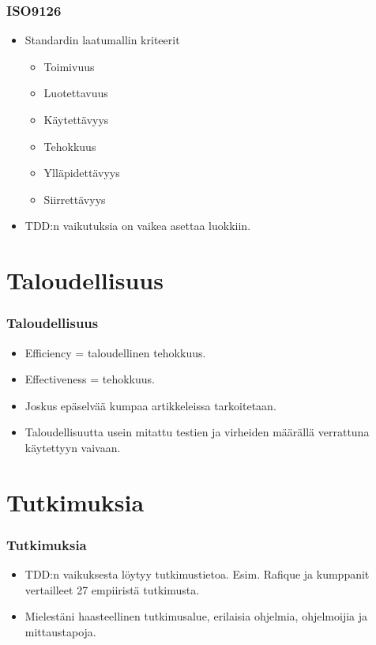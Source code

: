 \documentclass{beamer}
\begin{document}
\begin{frame}
    	\frametitle{ISO9126}
	\begin{itemize}
	\item Standardin laatumallin kriteerit
		\begin{itemize}
		\item Toimivuus
		\item Luotettavuus
		\item Käytettävyys
		\item Tehokkuus
		\item Ylläpidettävyys
		\item Siirrettävyys
		\end{itemize}
	\item TDD:n vaikutuksia on vaikea asettaa luokkiin.
	\end{itemize}
\end{frame}

\section{Taloudellisuus}

\begin{frame}
    	\frametitle{Taloudellisuus}
	\begin{itemize}
	\item Efficiency = taloudellinen tehokkuus.
	\item Effectiveness = tehokkuus.
	\item Joskus epäselvää kumpaa artikkeleissa tarkoitetaan.
	\item Taloudellisuutta usein mitattu testien ja virheiden määrällä verrattuna käytettyyn vaivaan.
	\end{itemize}
\end{frame}

\section{Tutkimuksia}

\begin{frame}
    	\frametitle{Tutkimuksia}
	\begin{itemize}
	\item TDD:n vaikuksesta löytyy tutkimustietoa. Esim. Rafique ja kumppanit vertailleet 27 empiiristä tutkimusta.
	\item Mielestäni haasteellinen tutkimusalue, erilaisia ohjelmia, ohjelmoijia ja mittaustapoja. 
	\end{itemize}

\end{frame}
\end{document}
